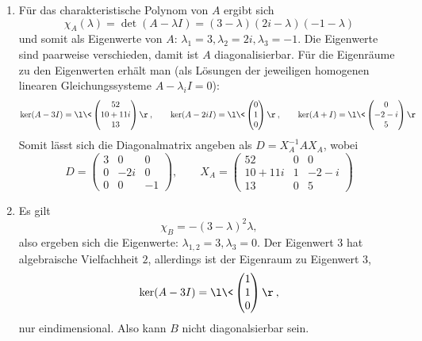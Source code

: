\documentclass{mywork}
\begin{document}
\setcounter{section}{11}

\begin{aufgabe}
	\begin{enumerate}[$A$:]
		\item
			Für das charakteristische Polynom von $A$ ergibt sich
			\[
				\chi_A(\lambda) 
				= \det(A-\lambda I) 
				= (3-\lambda)(2i - \lambda)(-1-\lambda)
			\]
			und somit als Eigenwerte von $A$: $\lambda_1=3, \lambda_2 = 2i, \lambda_3 = -1$.
			Die Eigenwerte sind paarweise verschieden,
			damit ist $A$ diagonalisierbar.
			Für die Eigenräume zu den Eigenwerten erhält man (als Lösungen der jeweiligen homogenen linearen Gleichungssysteme $A-\lambda_i I = 0$):
			\[
				\ker(A-3I) = \l\< \begin{pmatrix}
					52 \\ 10 + 11i \\ 13
				\end{pmatrix}\r\>, \qquad
				\ker(A-2i I) = \l\< \begin{pmatrix}
					0 \\ 1 \\ 0
				\end{pmatrix}\r\>, \qquad
				\ker(A + I) = \l\< \begin{pmatrix}
					0 \\ -2 -i \\ 5
				\end{pmatrix}\r\>
			\]
			Somit lässt sich die Diagonalmatrix angeben als $D = X_A^{-1} A X_A$, wobei
			\[
				D = \begin{pmatrix}
					3 & 0 & 0 \\
					0 & -2i & 0 \\
					0 & 0 & -1
				\end{pmatrix}, \qquad
				X_A = \begin{pmatrix}
					52 & 0 & 0 \\
					10 + 11i & 1 & -2 -i \\
					13 & 0 & 5
				\end{pmatrix}
			\]
		\item
			Es gilt
			\[
				\chi_B = -(3-\lambda)^2 \lambda,
			\]
			also ergeben sich die Eigenwerte: $\lambda_{1,2} = 3, \lambda_3 = 0$.
			Der Eigenwert $3$ hat algebraische Vielfachheit $2$, allerdings ist der Eigenraum zu Eigenwert $3$,
			\[
				\ker (A-3I) = \l\< \begin{pmatrix}
					1 \\ 1 \\ 0
				\end{pmatrix}\r\>,
			\]
			nur eindimensional.
			Also kann $B$ nicht diagonalsierbar sein.
	\end{enumerate}
\end{aufgabe}
\end{document}
